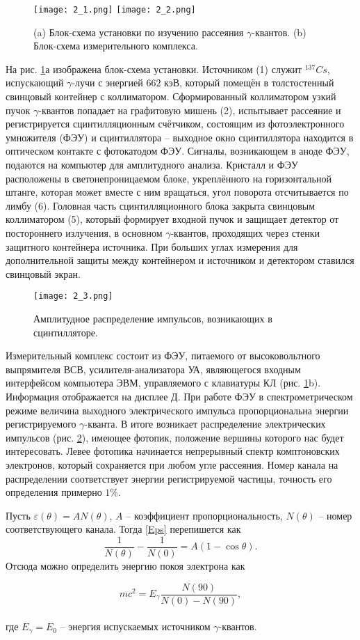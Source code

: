\begin{figure}[h]
  \texttt{[image: 2\_1.png]}
  \texttt{[image: 2\_2.png]}
  \centering
  \caption{(a) Блок-схема установки по изучению рассеяния $\gamma$-квантов. (b) Блок-схема измерительного комплекса.}
  \label{Device}
\end{figure}

На рис. \ref{Device}а изображена блок-схема установки. Источником (1) служит
${}^{137}Cs$, испускающий $\gamma$-лучи с энергией $662$ кэВ, который помещён в
толстостенный свинцовый контейнер с коллиматором. Сформированный коллиматором
узкий пучок $\gamma$-квантов попадает на графитовую мишень (2), испытывает
рассеяние и регистрируется сцинтилляционным счётчиком, состоящим из
фотоэлектронного умножителя (ФЭУ) и сцинтиллятора -- выходное окно сцинтиллятора
находится в оптическом контакте с фотокатодом ФЭУ. Сигналы, возникающем в аноде
ФЭУ, подаются на компьютер для амплитудного анализа. Кристалл и ФЭУ расположены
в светонепроницаемом блоке, укреплённого на горизонтальной штанге, которая может
вместе с ним вращаться, угол поворота отсчитывается по лимбу (6). Головная часть
сцинтилляционного блока закрыта свинцовым коллиматором (5), который формирует
входной пучок и защищает детектор от постороннего излучения, в основном
$\gamma$-квантов, проходящих через стенки защитного контейнера источника. При
больших углах измерения для дополнительной защиты между контейнером и источником
и детектором ставился свинцовый экран.

\begin{figure}[h]
  \texttt{[image: 2\_3.png]}
  \centering
  \caption{Амплитудное распределение импульсов, возникающих в сцинтилляторе.}
  \label{Channel}
\end{figure}

Измерительный комплекс состоит из ФЭУ, питаемого от высоковольтного выпрямителя
ВСВ, усилителя-анализатора УА, являющегося входным интерфейсом компьютера ЭВМ,
управляемого с клавиатуры КЛ (рис. \ref{Device}b). Информация отображается на
дисплее Д. При работе ФЭУ в спектрометрическом режиме величина выходного
электрического импульса пропорциональна энергии регистрируемого $\gamma$-кванта.
В итоге возникает распределение электрических импульсов (рис. \ref{Channel}),
имеющее фотопик, положение вершины которого нас будет интересовать. Левее
фотопика начинается непрерывный спектр комптоновских электронов, который
сохраняется при любом угле рассеяния. Номер канала на распределении
соответствует энергии регистрируемой частицы, точность его определения примерно
$1\%$.


Пусть $\varepsilon(\theta) = AN(\theta)$, $A$ -- коэффициент пропорциональность,
$N(\theta)$ -- номер соответствующего канала. Тогда \eqref{Eps} перепишется как
\[\tag{1b}\label{1b} \dfrac{1}{N(\theta)} - \dfrac{1}{N(0)} = A(1-\cos
  \theta).\] Отсюда можно определить энергию покоя электрона как

\begin{equation}\label{2}
  mc^2 = E_\gamma \dfrac{N(90)}{N(0) - N(90)},
\end{equation}
\\
где $E_\gamma = E_0$ -- энергия испускаемых источником $\gamma$-квантов.

